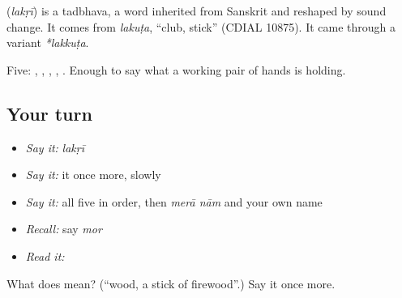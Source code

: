 \begin{cousinweb}
\textbf{} (\emph{lakṛī}) is a tadbhava, a word inherited from Sanskrit and reshaped by sound change. It comes from \emph{lakuṭa}, \textquotedblleft{}club, stick\textquotedblright{} (CDIAL 10875). It came through a variant \emph{*lakkuṭa}.
\end{cousinweb}

\begin{grammarlens}[title={What you've built}]
Five: , , , , . Enough to say what a working pair of hands is holding.
\end{grammarlens}

\subsection*{Your turn}
\begin{itemize}
\raggedright
  \item \emph{Say it:} \emph{lakṛī}
  \item \emph{Say it:} it once more, slowly
  \item \emph{Say it:} all five in order, then \emph{merā nām} and your own name
  \item \emph{Recall:} say \emph{mor}
  \item \emph{Read it:} \textbf{}
\end{itemize}

\begin{tcolorbox}[breakable,colback=teal!4,colframe=teal!35!black,title={Before you move on}]
What does  mean? (\textquotedblleft{}wood, a stick of firewood\textquotedblright{}.) Say it once more.
\end{tcolorbox}
